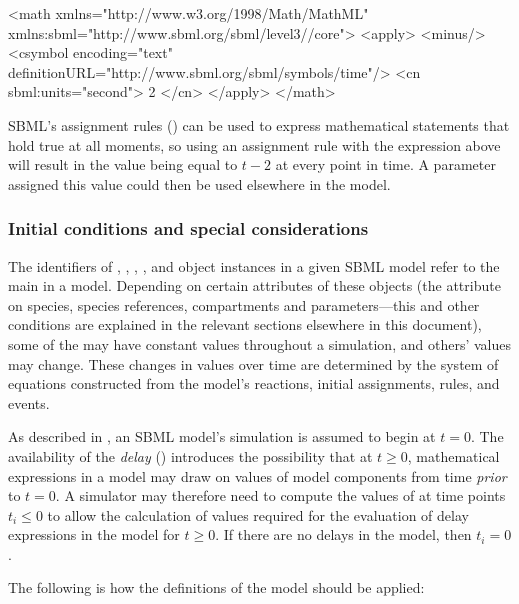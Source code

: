 \begin{example}
<math xmlns="http://www.w3.org/1998/Math/MathML"
      xmlns:sbml="http://www.sbml.org/sbml/level3//core">
    <apply>
        <minus/>
        <csymbol encoding="text" definitionURL="http://www.sbml.org/sbml/symbols/time"/> 
        <cn sbml:units="second"> 2 </cn>
    </apply>
</math>
\end{example}

SBML's assignment rules () can be
used to express mathematical statements that hold true at all
moments, so using an assignment rule with the expression above
will result in the value being equal to $t - 2$ at every point in
time.  A parameter assigned this value could then be used
elsewhere in the model.


\subsubsection{Initial conditions and special considerations}
\label{sec:before-t0}

The identifiers of \Species, \SpeciesReference, \Compartment, \Parameter, and
\Reaction object instances in a given SBML model refer to the main
 in a model.  Depending on certain attributes of these
objects (\eg the attribute  on species, species references, compartments
and parameters---this and other conditions are explained in the
relevant sections elsewhere in this document), some of the
 may have constant values throughout a simulation, and
others' values may change.  These changes in values over time are
determined by the system of equations constructed from the model's
reactions, initial assignments, rules, and events.

As described in , an SBML model's
simulation is assumed to begin at $t = 0$.  The availability of
the \emph{delay}  ()
introduces the possibility that at $t \geq 0$, mathematical
expressions in a model may draw on values of model components from
time \emph{prior} to $t = 0$.  A simulator may therefore need to
compute the values of  at time points $t_i \leq 0$ to
allow the calculation of values required for the evaluation of
delay expressions in the model for $t \geq 0$.  If there are no
delays in the model, then $t_i = 0$.

The following is how the definitions of the model should be
applied:

